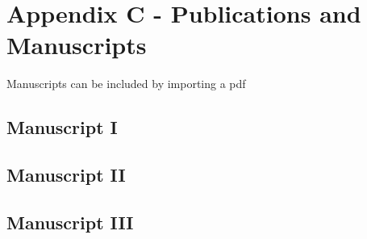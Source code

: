 \chapter{Appendix C - Publications and Manuscripts}
\label{chap:publications}

Manuscripts can be included by importing a pdf

\section{Manuscript I}


\section{Manuscript II}


\section{Manuscript III}

